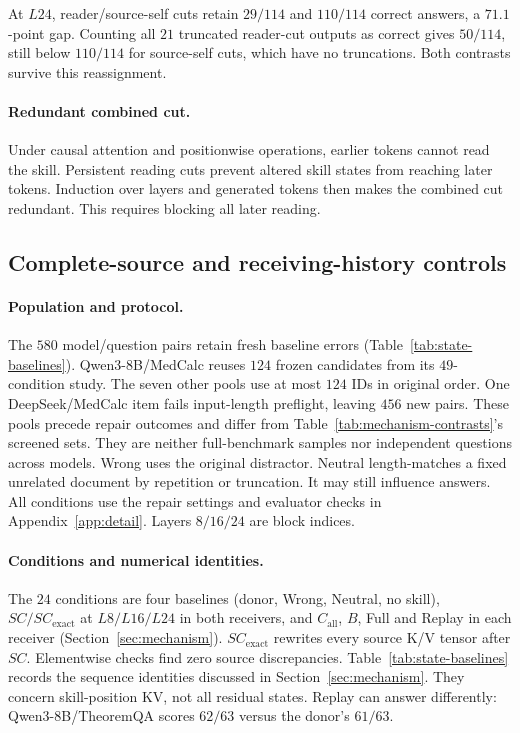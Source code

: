 At $L24$, reader/source-self cuts retain $29/114$ and $110/114$ correct
answers, a $71.1$-point gap. Counting all $21$ truncated reader-cut
outputs as correct gives $50/114$, still below $110/114$ for source-self
cuts, which have no truncations. Both contrasts survive this reassignment.

\paragraph{Redundant combined cut.}
Under causal attention and positionwise operations, earlier tokens cannot
read the skill. Persistent reading cuts prevent altered skill states from
reaching later tokens. Induction over layers and generated tokens then
makes the combined cut redundant. This requires blocking all later reading.




\subsection{Complete-source and receiving-history controls}
\label{app:state-completeness}

\paragraph{Population and protocol.}
The $580$ model/question pairs retain fresh baseline errors
(Table~\ref{tab:state-baselines}). Qwen3-8B/MedCalc reuses $124$ frozen
candidates from its $49$-condition study. The seven other pools use at
most $124$ IDs in original order. One DeepSeek/MedCalc item
fails input-length preflight, leaving $456$ new pairs. These pools precede
repair outcomes and differ from Table~\ref{tab:mechanism-contrasts}'s
screened sets. They are neither full-benchmark samples nor independent
questions across models. Wrong uses the original distractor. Neutral
length-matches a fixed unrelated document by repetition or truncation.
It may still influence answers. All conditions use the repair settings
and evaluator checks in Appendix~\ref{app:detail}. Layers $8/16/24$
are block indices.

\paragraph{Conditions and numerical identities.}
The $24$ conditions are four baselines (donor, Wrong, Neutral, no skill),
$SC/SC_{\mathrm{exact}}$ at $L8/L16/L24$ in both receivers, and
$C_{\mathrm{all}}$, $B$, Full and Replay in each receiver
(Section~\ref{sec:mechanism}). $SC_{\mathrm{exact}}$ rewrites every source
K/V tensor after $SC$. Elementwise checks find zero source discrepancies.
Table~\ref{tab:state-baselines} records the sequence identities discussed
in Section~\ref{sec:mechanism}. They concern skill-position KV, not all
residual states. Replay can answer differently: Qwen3-8B/TheoremQA scores
$62/63$ versus the donor's $61/63$.

